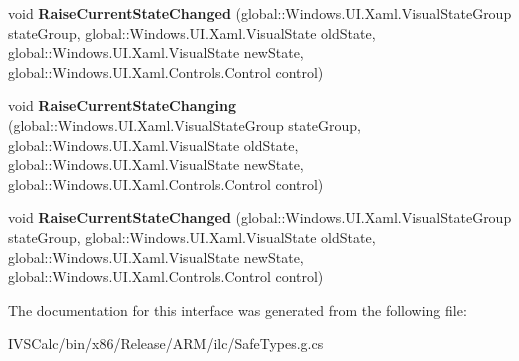 \begin{DoxyCompactItemize}
void {\bfseries Raise\+Current\+State\+Changed} (global\+::\+Windows.\+U\+I.\+Xaml.\+Visual\+State\+Group state\+Group, global\+::\+Windows.\+U\+I.\+Xaml.\+Visual\+State old\+State, global\+::\+Windows.\+U\+I.\+Xaml.\+Visual\+State new\+State, global\+::\+Windows.\+U\+I.\+Xaml.\+Controls.\+Control control)
\item 
\mbox{\label{interface_windows_1_1_u_i_1_1_xaml_1_1_i_visual_state_manager_protected_ac1e3522381da08d1c931610141d5b03a}} 
void {\bfseries Raise\+Current\+State\+Changing} (global\+::\+Windows.\+U\+I.\+Xaml.\+Visual\+State\+Group state\+Group, global\+::\+Windows.\+U\+I.\+Xaml.\+Visual\+State old\+State, global\+::\+Windows.\+U\+I.\+Xaml.\+Visual\+State new\+State, global\+::\+Windows.\+U\+I.\+Xaml.\+Controls.\+Control control)
\item 
\mbox{\label{interface_windows_1_1_u_i_1_1_xaml_1_1_i_visual_state_manager_protected_afa2eeeca38b915ac90433ee45157dd08}} 
void {\bfseries Raise\+Current\+State\+Changed} (global\+::\+Windows.\+U\+I.\+Xaml.\+Visual\+State\+Group state\+Group, global\+::\+Windows.\+U\+I.\+Xaml.\+Visual\+State old\+State, global\+::\+Windows.\+U\+I.\+Xaml.\+Visual\+State new\+State, global\+::\+Windows.\+U\+I.\+Xaml.\+Controls.\+Control control)
\end{DoxyCompactItemize}


The documentation for this interface was generated from the following file\+:\begin{DoxyCompactItemize}
\item 
I\+V\+S\+Calc/bin/x86/\+Release/\+A\+R\+M/ilc/Safe\+Types.\+g.\+cs\end{DoxyCompactItemize}
